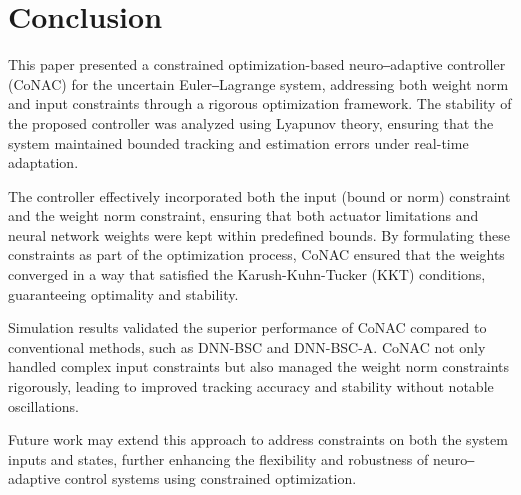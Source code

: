 \documentclass[lettersize,journal]{IEEEtran}
\begin{document}

\section{Conclusion}\label{sec:conclusion}

This paper presented a constrained optimization-based neuro‒adaptive controller (CoNAC) for the uncertain Euler‒Lagrange system, addressing both weight norm and input constraints through a rigorous optimization framework. The stability of the proposed controller was analyzed using Lyapunov theory, ensuring that the system maintained bounded tracking and estimation errors under real-time adaptation.

The controller effectively incorporated both the input (bound or norm) constraint and the weight norm constraint, ensuring that both actuator limitations and neural network weights were kept within predefined bounds. By formulating these constraints as part of the optimization process, CoNAC ensured that the weights converged in a way that satisfied the Karush-Kuhn-Tucker (KKT) conditions, guaranteeing optimality and stability.

Simulation results validated the superior performance of CoNAC compared to conventional methods, such as DNN-BSC and DNN-BSC-A. CoNAC not only handled complex input constraints but also managed the weight norm constraints rigorously, leading to improved tracking accuracy and stability without notable oscillations.

Future work may extend this approach to address constraints on both the system inputs and states, further enhancing the flexibility and robustness of neuro‒adaptive control systems using constrained optimization.



\end{document}
